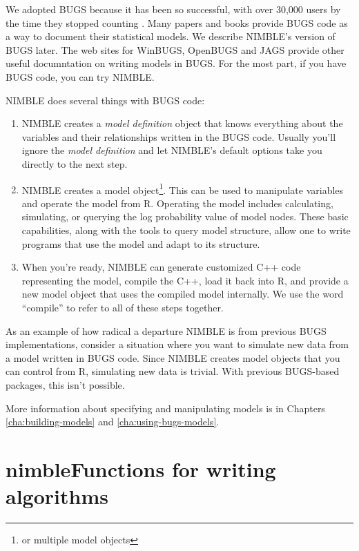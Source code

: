 \documentclass[12pt,oneside]{book}\usepackage[]{graphicx}\usepackage[]{color}
\def\nm#1{\textit{#1}}
\begin{document}
We adopted BUGS because it has been so successful, with over 30,000
users by the time they stopped counting
\citep{Lunn_Spiegelhalter_Thomas_Best_2009}.  Many papers and books
provide BUGS code as a way to document their statistical models. We
describe NIMBLE's version of BUGS later.  The web sites for WinBUGS,
OpenBUGS and JAGS provide other useful documntation on writing models
in BUGS.  For the most part, if you have BUGS code, you can try
NIMBLE.

NIMBLE does several things with BUGS code:
\begin{enumerate}
\item NIMBLE creates a \nm{model definition} object that knows
  everything about the variables and their relationships written in
  the BUGS code.  Usually you'll ignore the \nm{model definition}
  and let NIMBLE's default options take you directly to the next step.
\item NIMBLE creates a model object\footnote{or multiple model
    objects}.  This can be used to
  manipulate variables and operate the model from R.  Operating the
  model includes calculating, simulating, or querying the log
  probability value of model nodes. These basic capabilities, along
  with the tools to query model structure, allow one to write
  programs that use the model and adapt to its structure.
\item When you're ready, NIMBLE can generate customized C++ code
  representing the model, compile the C++, load it back into R, and
  provide a new model object that uses the compiled model
  internally.  We use the word ``compile'' to refer to all of these
  steps together.
\end{enumerate}

As an example of how radical a departure NIMBLE is from previous BUGS
implementations, consider a situation where you want to simulate new
data from a model written in BUGS code.  Since NIMBLE creates model
objects that you can control from R, simulating new data is trivial.
With previous BUGS-based packages, this isn't possible.

More information about specifying and manipulating models is in
Chapters \ref{cha:building-models} and \ref{cha:using-bugs-models}.

\section{nimbleFunctions for writing algorithms}
\label{sec:nimble-lang-writ}
\end{document}
